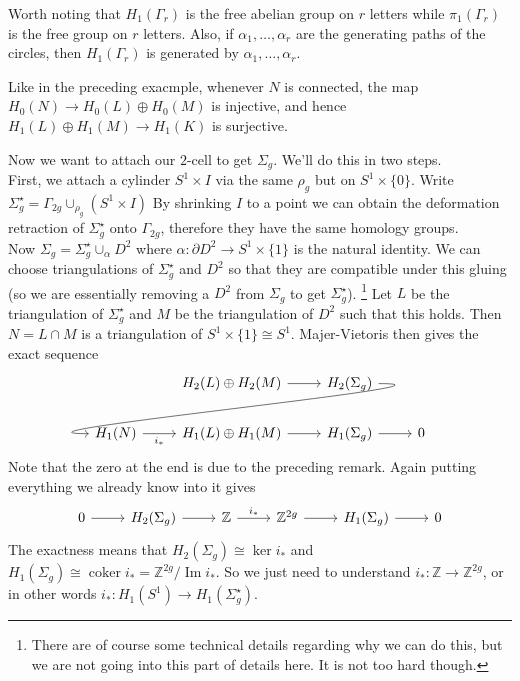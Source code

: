 Worth noting that $H_1(\Gamma_r)$ is the free abelian group on $r$ letters while $\pi_1(\Gamma_r)$ is the free group on $r$ letters.
Also, if $\alpha_1,\ldots,\alpha_r$ are the generating paths of the circles, then $H_1(\Gamma_r)$ is generated by $\alpha_1,\ldots,\alpha_r$.
\begin{remark}
    Like in the preceding exacmple, whenever $N$ is connected, the map $H_0(N)\to H_0(L)\oplus H_0(M)$ is injective, and hence $H_1(L)\oplus H_1(M)\to H_1(K)$ is surjective.
\end{remark}
Now we want to attach our $2$-cell to get $\Sigma_g$.
We'll do this in two steps.\\
First, we attach a cylinder $S^1\times I$ via the same $\rho_g$ but on $S^1\times\{0\}$.
Write $\Sigma_g^\star=\Gamma_{2g}\cup_{\rho_g} (S^1\times I)$
By shrinking $I$ to a point we can obtain the deformation retraction of $\Sigma_g^\star$ onto $\Gamma_{2g}$, therefore they have the same homology groups.\\
Now $\Sigma_g=\Sigma_g^\star\cup_\alpha D^2$ where $\alpha:\partial D^2\to S^1\times \{1\}$ is the natural identity.
We can choose triangulations of $\Sigma_g^\star$ and $D^2$ so that they are compatible under this gluing (so we are essentially removing a $D^2$ from $\Sigma_g$ to get $\Sigma_g^\star$).
\footnote{There are of course some technical details regarding why we can do this, but we are not going into this part of details here. It is not too hard though.}
Let $L$ be the triangulation of $\Sigma_g^\star$ and $M$ be the triangulation of $D^2$ such that this holds.
Then $N=L\cap M$ is a triangulation of $S^1\times\{1\}\cong S^1$.
Majer-Vietoris then gives the exact sequence
\[
    \begin{tikzcd}
        &H_2(L)\oplus H_2(M)\arrow{r}&H_2(\Sigma_g)\arrow[overlay, out=0,in=180]{dll}&\\
        H_1(N)\arrow[swap]{r}{i_\ast}&H_1(L)\oplus H_1(M)\arrow{r}&H_1(\Sigma_g)\arrow{r}&0
    \end{tikzcd}
\]
Note that the zero at the end is due to the preceding remark.
Again putting everything we already know into it gives
\[
    \begin{tikzcd}
        0\arrow{r}&H_2(\Sigma_g)\arrow{r}&\mathbb Z\arrow{r}{i_\ast}&\mathbb Z^{2g}\arrow{r}&H_1(\Sigma_g)\arrow{r}&0
    \end{tikzcd}
\]
The exactness means that $H_2(\Sigma_g)\cong\ker i_\ast$ and $H_1(\Sigma_g)\cong\operatorname{coker}i_\ast=\mathbb Z^{2g}/\operatorname{Im}i_\ast$.
So we just need to understand $i_\ast:\mathbb Z\to\mathbb Z^{2g}$, or in other words $i_\ast:H_1(S^1)\to H_1(\Sigma_g^\star)$.
